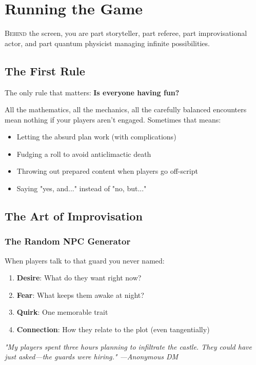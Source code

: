 \documentclass[11pt,letterpaper,openany]{book}
\newcommand{\fantasyquote}[1]{%
\begin{center}
\textit{\large #1}
\end{center}
}
\begin{document}
\chapter{Running the Game}

\lettrine[lines=3]{B}{ehind} the screen, you are part storyteller, part referee, part improvisational actor, and part quantum physicist managing infinite possibilities.

\section{The First Rule}

The only rule that matters: \textbf{Is everyone having fun?}

All the mathematics, all the mechanics, all the carefully balanced encounters mean nothing if your players aren't engaged. Sometimes that means:
\begin{itemize}
    \item Letting the absurd plan work (with complications)
    \item Fudging a roll to avoid anticlimactic death
    \item Throwing out prepared content when players go off-script
    \item Saying "yes, and..." instead of "no, but..."
\end{itemize}

\section{The Art of Improvisation}

\subsection{The Random NPC Generator}

When players talk to that guard you never named:
\begin{enumerate}
    \item \textbf{Desire}: What do they want right now?
    \item \textbf{Fear}: What keeps them awake at night?
    \item \textbf{Quirk}: One memorable trait
    \item \textbf{Connection}: How they relate to the plot (even tangentially)
\end{enumerate}

\fantasyquote{"My players spent three hours planning to infiltrate the castle. They could have just asked—the guards were hiring." —Anonymous DM}
\end{document}
